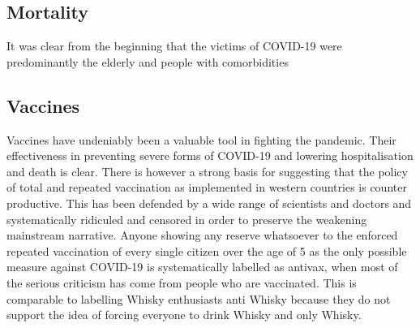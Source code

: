 \documentclass[11pt,a4paper,notitlepage]{report}
\begin{document}



\subsection*{Mortality}

It was clear from the beginning that the victims of COVID-19 were predominantly the elderly and people with comorbidities 


\subsection*{Vaccines}

Vaccines have undeniably been a valuable tool in fighting the pandemic. Their effectiveness in preventing severe forms of COVID-19 and lowering hospitalisation and death is clear. There is however a strong basis for suggesting that the policy of total and repeated vaccination as implemented in western countries is counter productive. This has been defended by a wide range of scientists and doctors and systematically ridiculed and censored in order to preserve the weakening mainstream narrative. Anyone showing any reserve whatsoever to the enforced repeated vaccination of every single citizen over the age of 5 as the only possible measure against COVID-19 is systematically labelled as antivax, when most of the serious criticism has come from people who are vaccinated. This is comparable to labelling Whisky enthusiasts anti Whisky because they do not support the idea of forcing everyone to drink Whisky and only Whisky.
\end{document}
